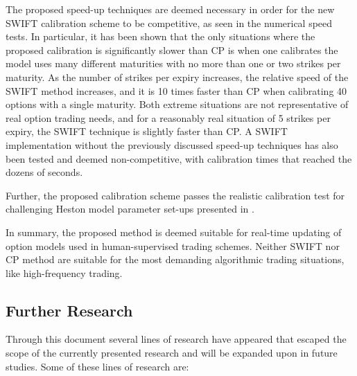 \documentclass[12,twoside]{mammeTFM}
\theoremstyle{definition}
\theoremstyle{remark}
\begin{document}
The proposed speed-up techniques are deemed necessary in order for the new SWIFT calibration scheme to be competitive, as seen in the numerical speed tests. In particular, it has been shown that the only situations where the proposed calibration is significantly slower than CP is when one calibrates the model uses many different maturities with no more than one or two strikes per maturity. As the number of strikes per expiry increases, the relative speed of the SWIFT method increases, and it is 10 times faster than CP when calibrating 40 options with a single maturity. Both extreme situations are not representative of real option trading needs, and for a reasonably real situation of 5 strikes per expiry, the SWIFT technique is slightly faster than CP. A SWIFT implementation without the previously discussed speed-up techniques has also been tested and deemed non-competitive, with calibration times that reached the dozens of seconds.

Further, the proposed calibration scheme passes the realistic calibration test for challenging Heston model parameter set-ups presented in \cite{cui17}.

In summary, the proposed method is deemed suitable for real-time updating of option models used in human-supervised trading schemes. Neither SWIFT nor CP method are suitable for the most demanding algorithmic trading situations, like high-frequency trading.

\subsection{Further Research}
Through this document several lines of research have appeared that escaped the scope of the currently presented research and will be expanded upon in future studies. Some of these lines of research are:
\end{document}
